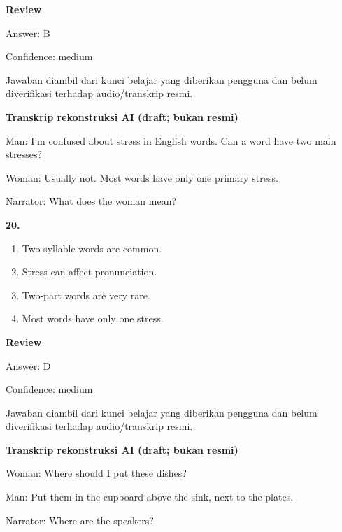 \documentclass[12pt]{article}
\begin{document}
\par
\begingroup
\setlength{\parskip}{0pt}
\setlength{\parindent}{0pt}
\textbf{Review}\par
Answer: B\par
Confidence: medium\par
Jawaban diambil dari kunci belajar yang diberikan pengguna dan belum diverifikasi terhadap audio/transkrip resmi.\par
\endgroup
\par
\vspace{0.25\baselineskip}
\begin{exampleblock}
\textbf{Transkrip rekonstruksi AI (draft; bukan resmi)}\par
Man: I'm confused about stress in English words. Can a word have two main stresses?\par
Woman: Usually not. Most words have only one primary stress.\par
Narrator: What does the woman mean?\par
\end{exampleblock}
\noindent\textbf{20.}
\begin{enumerate}[label=(\Alph*),leftmargin=*,itemsep=0.2em]
\item Two-syllable words are common.
\item Stress can affect pronunciation.
\item Two-part words are very rare.
\item Most words have only one stress.
\end{enumerate}
\par
\begingroup
\setlength{\parskip}{0pt}
\setlength{\parindent}{0pt}
\textbf{Review}\par
Answer: D\par
Confidence: medium\par
Jawaban diambil dari kunci belajar yang diberikan pengguna dan belum diverifikasi terhadap audio/transkrip resmi.\par
\endgroup
\par
\vspace{0.25\baselineskip}
\begin{exampleblock}
\textbf{Transkrip rekonstruksi AI (draft; bukan resmi)}\par
Woman: Where should I put these dishes?\par
Man: Put them in the cupboard above the sink, next to the plates.\par
Narrator: Where are the speakers?\par
\end{exampleblock}
\end{document}
